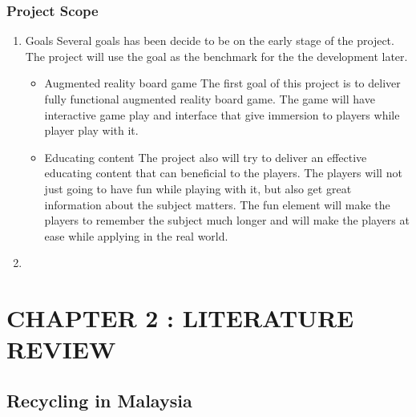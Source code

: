\documentclass[12pt]{article}
\begin{document}
\subsubsection{Project Scope}

\begin{enumerate}
    \item Goals
    \newline
    Several goals has been decide to be on the early stage of the project. The project will use the goal as the benchmark for the the development later. 
    \begin{itemize}
        \item Augmented reality board game
        \newline
        The first goal of this project is to deliver fully functional augmented reality board game. The game will have interactive game play and  interface that give immersion to players while player play with it.
        \item Educating content
        \newline
        The project also will try to deliver an effective educating content that can beneficial to the players. The players will not just going to have fun while playing with it, but also get great information about the subject matters. The fun element will make the players to remember the subject much longer and will make the players at ease while applying in the real world.
    \end{itemize}
    \item 
\end{enumerate}

\pagebreak

\section{CHAPTER 2 : LITERATURE REVIEW}

\subsection{Recycling in Malaysia}
\end{document}
